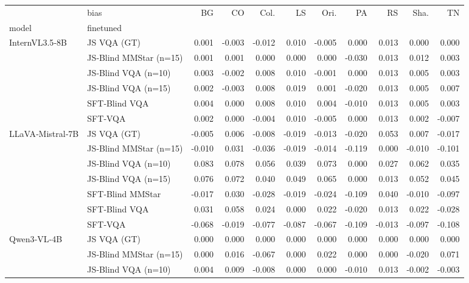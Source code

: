 \begin{tabular}{llrrrrrrrrr}
\toprule
 & bias & BG & CO & Col. & LS & Ori. & PA & RS & Sha. & TN \\
model & finetuned &  &  &  &  &  &  &  &  &  \\
\midrule
\multirow[t]{6}{*}{InternVL3.5‑8B} &  JS VQA (GT) & 0.001 & -0.003 & -0.012 & 0.010 & -0.005 & 0.000 & 0.013 & 0.000 & 0.000 \\
 &  JS‑Blind MMStar (n=15) & 0.001 & 0.001 & 0.000 & 0.000 & 0.000 & -0.030 & 0.013 & 0.012 & 0.003 \\
 &  JS‑Blind VQA (n=10) & 0.003 & -0.002 & 0.008 & 0.010 & -0.001 & 0.000 & 0.013 & 0.005 & 0.003 \\
 &  JS‑Blind VQA (n=15) & 0.002 & -0.003 & 0.008 & 0.019 & 0.001 & -0.020 & 0.013 & 0.005 & 0.007 \\
 &  SFT‑Blind VQA & 0.004 & 0.000 & 0.008 & 0.010 & 0.004 & -0.010 & 0.013 & 0.005 & 0.003 \\
 &  SFT‑VQA & 0.002 & 0.000 & -0.004 & 0.010 & -0.005 & 0.000 & 0.013 & 0.002 & -0.007 \\
\cline{1-11}
\multirow[t]{7}{*}{LLaVA‑Mistral‑7B} &  JS VQA (GT) & -0.005 & 0.006 & -0.008 & -0.019 & -0.013 & -0.020 & 0.053 & 0.007 & -0.017 \\
 &  JS‑Blind MMStar (n=15) & -0.010 & 0.031 & -0.036 & -0.019 & -0.014 & -0.119 & 0.000 & -0.010 & -0.101 \\
 &  JS‑Blind VQA (n=10) & 0.083 & 0.078 & 0.056 & 0.039 & 0.073 & 0.000 & 0.027 & 0.062 & 0.035 \\
 &  JS‑Blind VQA (n=15) & 0.076 & 0.072 & 0.040 & 0.049 & 0.065 & 0.000 & 0.013 & 0.052 & 0.045 \\
 &  SFT‑Blind MMStar & -0.017 & 0.030 & -0.028 & -0.019 & -0.024 & -0.109 & 0.040 & -0.010 & -0.097 \\
 &  SFT‑Blind VQA & 0.031 & 0.058 & 0.024 & 0.000 & 0.022 & -0.020 & 0.013 & 0.022 & -0.028 \\
 &  SFT‑VQA & -0.068 & -0.019 & -0.077 & -0.087 & -0.067 & -0.109 & -0.013 & -0.097 & -0.108 \\
\cline{1-11}
\multirow[t]{6}{*}{Qwen3‑VL‑4B} &  JS VQA (GT) & 0.000 & 0.000 & 0.000 & 0.000 & 0.000 & 0.000 & 0.000 & 0.000 & 0.000 \\
 &  JS‑Blind MMStar (n=15) & 0.000 & 0.016 & -0.067 & 0.000 & 0.022 & 0.000 & 0.000 & -0.020 & 0.071 \\
 &  JS‑Blind VQA (n=10) & 0.004 & 0.009 & -0.008 & 0.000 & 0.000 & -0.010 & 0.013 & -0.002 & -0.003 \\

\end{tabular}
